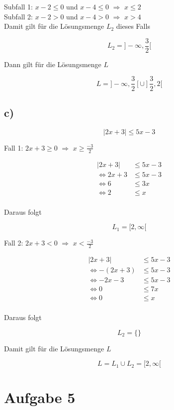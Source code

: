 \documentclass[a4paper, 11pt]{article}
\begin{document}
Subfall 1:  \(x - 2 \leq 0\) und \(x - 4 \leq 0\) \(\Rightarrow\) \(x \leq 2\) \\
Subfall 2:  \(x - 2 > 0\) und \(x - 4 > 0\) \(\Rightarrow\) \(x > 4\) \\

Damit gilt für die Lösungsmenge \(L_2\) dieses Falls

$$ L_2 = ]-\infty, \frac{3}{2}[ $$

Dann gilt für die Lösungsmenge \(L\)

$$ L = ]-\infty, \frac{3}{2}[ \cup ]\frac{3}{2}, 2[ $$

\subsection{c)}
\label{sec:org0f8d3b7}
$$ |2x + 3| \leq 5x - 3 $$

Fall 1: \(2x + 3 \geq 0\) \(\Rightarrow\) \(x \geq \frac{-3}{2}\)

\begin{align*}
    |2x + 3| &\leq 5x - 3 \\
    \Leftrightarrow 2x + 3 &\leq 5x - 3 \\
    \Leftrightarrow 6 &\leq 3x \\
    \Leftrightarrow 2 &\leq x \\
\end{align*}

Daraus folgt

$$ L_1 = [2, \infty[ $$

Fall 2:  \(2x + 3 < 0\) \(\Rightarrow\) \(x < \frac{-3}{2}\)

\begin{align*}
    |2x + 3| &\leq 5x - 3 \\
    \Leftrightarrow -(2x + 3) &\leq 5x - 3 \\
    \Leftrightarrow -2x - 3 &\leq 5x - 3 \\
    \Leftrightarrow 0 &\leq 7x \\
    \Leftrightarrow 0 &\leq x \\
\end{align*}

Daraus folgt

$$ L_2 = \{\} $$

Damit gilt für die Lösungsmenge \(L\)

$$ L = L_1 \cup L_2 = [2, \infty[ $$

\section{Aufgabe 5}
\label{sec:orgc8da0a0}
\end{document}
